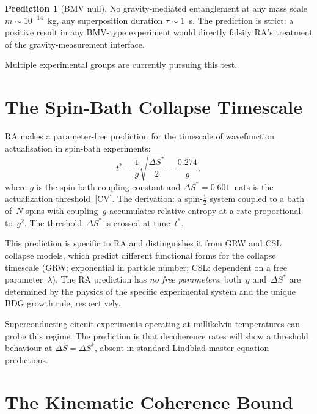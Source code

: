 \documentclass[11pt,a4paper]{article}
\theoremstyle{plain}
\theoremstyle{definition}
\newtheorem{prediction}[theorem]{Prediction}
\theoremstyle{remark}
\begin{document}
\begin{prediction}[BMV null]\label{pred:bmv}
No gravity-mediated entanglement at any mass scale $m \sim 10^{-14}$~kg,
any superposition duration $\tau \sim 1$~s.  The prediction is strict: a
positive result in any BMV-type experiment would directly falsify RA's
treatment of the gravity-measurement interface.
\end{prediction}

Multiple experimental groups are currently pursuing this test.

\section{The Spin-Bath Collapse Timescale}\label{sec:spinbath}

RA makes a parameter-free prediction for the timescale of wavefunction
actualisation in spin-bath experiments:
\begin{equation}
\boxed{t^* = \frac{1}{g}\sqrt{\frac{\Delta S^*}{2}} = \frac{0.274}{g},}
\label{eq:spinbath}
\end{equation}
where $g$ is the spin-bath coupling constant and $\Delta S^* = 0.601$~nats is the
actualization threshold~[CV].  The derivation: a spin-$\tfrac{1}{2}$ system coupled
to a bath of~$N$ spins with coupling~$g$ accumulates relative entropy at a rate
proportional to~$g^2$.  The threshold~$\Delta S^*$ is crossed at time~$t^*$.

This prediction is specific to RA and distinguishes it from GRW and CSL collapse
models, which predict different functional forms for the collapse timescale (GRW:
exponential in particle number; CSL: dependent on a free parameter~$\lambda$).  The
RA prediction has \emph{no free parameters}: both~$g$ and~$\Delta S^*$ are
determined by the physics of the specific experimental system and the unique BDG
growth rule, respectively.

Superconducting circuit experiments operating at millikelvin temperatures can probe
this regime.  The prediction is that decoherence rates will show a threshold
behaviour at $\Delta S = \Delta S^*$, absent in standard Lindblad master equation
predictions.

\section{The Kinematic Coherence Bound}\label{sec:kcb}
\end{document}
